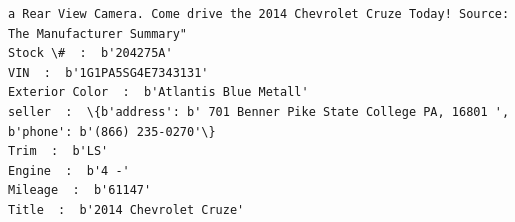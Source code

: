 \documentclass[11pt]{article}
\begin{document}
\begin{Verbatim}[commandchars=\\\{\}]
a Rear View Camera. Come drive the 2014 Chevrolet Cruze Today! Source: The Manufacturer Summary"
Stock \#  :  b'204275A'
VIN  :  b'1G1PA5SG4E7343131'
Exterior Color  :  b'Atlantis Blue Metall'
seller  :  \{b'address': b' 701 Benner Pike State College PA, 16801 ', b'phone': b'(866) 235-0270'\}
Trim  :  b'LS'
Engine  :  b'4 -'
Mileage  :  b'61147'
Title  :  b'2014 Chevrolet Cruze'


    \end{Verbatim}

    
    

    
    
    
    
\end{document}
